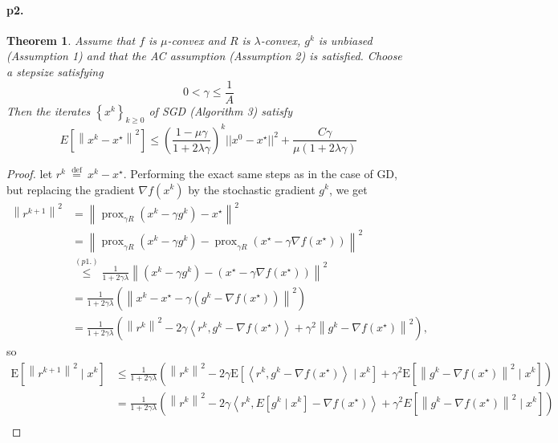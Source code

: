 \documentclass[12pt,a4paper]{article}
\newtheorem*{theorem}{Theorem}
\begin{document}
	\paragraph{p2.}
	\begin{theorem}
		Assume that $f$ is $\mu$-convex and $R$ is $\lambda$-convex, $g^{k}$ is unbiased (Assumption 1) and that the AC assumption (Assumption 2) is satisfied. Choose a stepsize satisfying
		$$
		0<\gamma \leq \frac{1}{A}
		$$
		Then the iterates $\left\{x^{k}\right\}_{k \geq 0}$ of SGD (Algorithm 3) satisfy
		$$
		E\left[\left\|x^{k}-x^{\star}\right\|^{2}\right] \leq(\frac{1-\mu\gamma}{1+2\lambda\gamma})^k||x^0-x^{\star}||^2+ \frac{C\gamma}{\mu(1+2\lambda\gamma)}
		$$
	\end{theorem}
	\begin{proof}
		 let $r^{k} \stackrel{\text { def }}{=} x^{k}-x^{\star} .$ Performing the exact same steps as in the case of GD, but replacing the gradient $\nabla f\left(x^{k}\right)$ by the stochastic gradient $g^{k}$, we get
		$$
		\begin{aligned}
			\left\|r^{k+1}\right\|^{2} & =\left\|\operatorname{prox}_{\gamma R}\left(x^{k}-\gamma g^{k}\right)-x^{\star}\right\|^{2} \\
			& \stackrel{}{=}\left\|\operatorname{prox}_{\gamma R}\left(x^{k}-\gamma g^{k}\right)-\operatorname{prox}_{\gamma R}\left(x^{\star}-\gamma \nabla f\left(x^{\star}\right)\right)\right\|^{2} \\
			& \stackrel{(p1.)}{\leq}\frac{1}{1+2\gamma\lambda}\left\|\left(x^{k}-\gamma g^{k}\right)-\left(x^{\star}-\gamma \nabla f\left(x^{\star}\right)\right)\right\|^{2} \\
		    & =\frac{1}{1+2\gamma\lambda}(\left\|x^{k}-x^{\star}-\gamma\left(g^{k}-\nabla f\left(x^{\star}\right)\right)\right\|^{2}) \\
			& =\frac{1}{1+2\gamma\lambda}(\left\|r^{k}\right\|^{2}-2 \gamma\left\langle r^{k}, g^{k}-\nabla f\left(x^{\star}\right)\right\rangle+\gamma^{2}\left\|g^{k}-\nabla f\left(x^{\star}\right)\right\|^{2}),
		\end{aligned}
		$$
		so 
		$$
		\begin{aligned}
			\mathrm{E}\left[\left\|r^{k+1}\right\|^{2} \mid x^{k}\right] & \leq\frac{1}{1+2\gamma\lambda}(\left\|r^{k}\right\|^{2}-2 \gamma \mathrm{E}\left[\left\langle r^{k}, g^{k}-\nabla f\left(x^{\star}\right)\right\rangle \mid x^{k}\right]+\gamma^{2} \mathrm{E}\left[\left\|g^{k}-\nabla f\left(x^{\star}\right)\right\|^{2} \mid x^{k}\right]) \\
			&=\frac{1}{1+2\gamma\lambda}(\left\|r^{k}\right\|^{2}-2 \gamma\left\langle r^{k}, E\left[g^{k} \mid x^{k}\right]-\nabla f\left(x^{\star}\right)\right\rangle+\gamma^{2} E\left[\left\|g^{k}-\nabla f\left(x^{\star}\right)\right\|^{2} \mid x^{k}\right]) \\

\end{aligned}$$
\end{proof}
\end{document}
